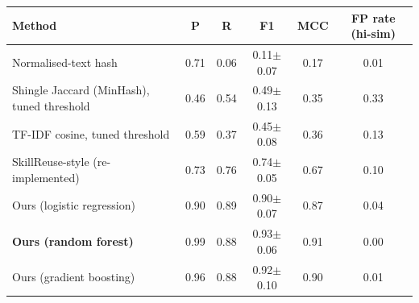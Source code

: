 \begin{tabular}{lccccc}
\toprule
Method & P & R & F1 & MCC & FP rate (hi-sim) \\
\midrule
Normalised-text hash & 0.71 & 0.06 & 0.11$\pm$0.07 & 0.17 & 0.01 \\
Shingle Jaccard (MinHash), tuned threshold & 0.46 & 0.54 & 0.49$\pm$0.13 & 0.35 & 0.33 \\
TF-IDF cosine, tuned threshold & 0.59 & 0.37 & 0.45$\pm$0.08 & 0.36 & 0.13 \\
SkillReuse-style (re-implemented) & 0.73 & 0.76 & 0.74$\pm$0.05 & 0.67 & 0.10 \\
\midrule
Ours (logistic regression) & 0.90 & 0.89 & 0.90$\pm$0.07 & 0.87 & 0.04 \\
\textbf{Ours (random forest)} & 0.99 & 0.88 & 0.93$\pm$0.06 & 0.91 & 0.00 \\
Ours (gradient boosting) & 0.96 & 0.88 & 0.92$\pm$0.10 & 0.90 & 0.01 \\
\bottomrule
\end{tabular}
